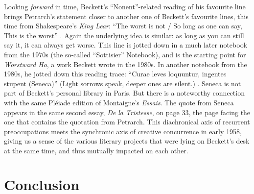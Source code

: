 \begin{paper}
Looking \emph{forward} in time, Beckett's ``Nonent''-related reading of
his favourite line brings Petrarch's statement closer to another one of
Beckett's favourite lines, this time from Shakespeare's \emph{King
Lear}: ``The worst is not / So long as one can say, This is the worst'' \citep[qtd. in][UoR MS 2910, 14v]{van_hulle_beckett_2010}. Again the underlying idea is similar: as long as you can
still say it, it can always get worse. This line is jotted down in a
much later notebook from the 1970s (the so-called ``Sottisier'' Notebook),
and is the starting point for \emph{Worstward Ho}, a work Beckett wrote
in the 1980s. In another notebook from the 1980s, he jotted down this
reading trace: ``Curae leves loquuntur, ingentes stupent (Seneca)''
(Light sorrows speak, deeper ones are silent.) . Seneca is not part of Beckett's personal library in Paris.
But there is a noteworthy connection with the same Pléiade edition of
Montaigne's \emph{Essais}. The quote from Seneca appears in the same
second essay, \emph{De la Tristesse}, on page 33, the page facing the
one that contains the quotation from Petrarch. This diachronical axis of
recurrent preoccupations meets the synchronic axis of creative
concurrence in early 1958, giving us a sense of the various literary
projects that were lying on Beckett's desk at the same time, and thus
mutually impacted on each other.

\section{Conclusion}


\end{paper}
